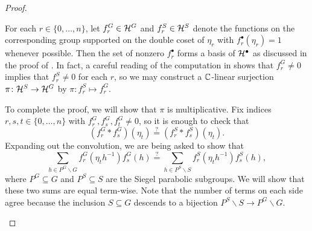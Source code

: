\begin{proof}
\begin{itemize}
        For each $r\in\{0,\ldots,n\}$, let $f_r^G\in\mathcal{H}^G$ and $f_r^S\in\mathcal{H}^S$ denote the functions on the corresponding group supported on the double coset of $\eta_r$ with $f_r^\bullet(\eta_r)=1$ whenever possible. Then the set of nonzero $f_r^\bullet$ forms a basis of $\mathcal{H}^\bullet$ as discussed in the proof of . In fact, a careful reading of the computation in  shows that $f_r^G\ne0$ implies that $f_r^S\ne0$ for each $r$, so we may construct a $\mathbb C$-linear surjection $\pi\colon\mathcal{H}^S\to\mathcal{H}^G$ by $\pi\colon f_r^S\mapsto f_r^G$.

        To complete the proof, we will show that $\pi$ is multiplicative. Fix indices $r,s,t\in\{0,\ldots,n\}$ with $f_r^G,f_s^G,f_t^G\ne0$, so it is enough to check that
        \[\left(f_r^G*f_s^G\right)(\eta_t)\stackrel?=\left(f_r^S*f_s^S\right)(\eta_t).\]
        Expanding out the convolution, we are being asked to show that
        \[\sum_{h\in P^G\backslash G}f_r^G\left(\eta_th^{-1}\right)f_s^G(h)\stackrel?=\sum_{h\in P^S\backslash S}f_r^S\left(\eta_th^{-1}\right)f_s^S(h),\]
        where $P^G\subseteq G$ and $P^S\subseteq S$ are the Siegel parabolic subgroups. We will show that these two sums are equal term-wise. Note that the number of terms on each side agree because the inclusion $S\subseteq G$ descends to a bijection $P^S\backslash S\to P^G\backslash G$.



\end{itemize}
\end{proof}
